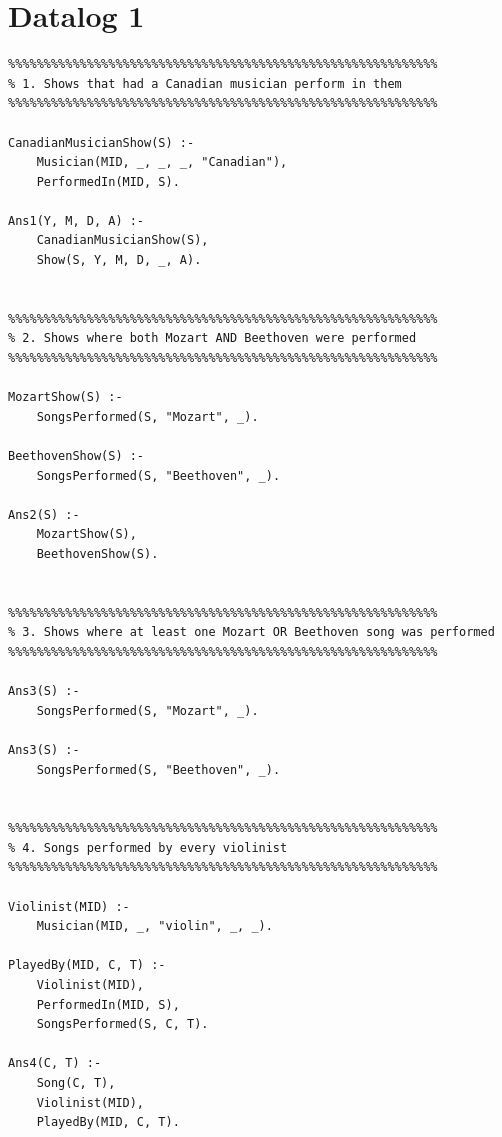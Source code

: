 \documentclass{article}
\begin{document}
\section*{Datalog 1}

\begin{verbatim}
%%%%%%%%%%%%%%%%%%%%%%%%%%%%%%%%%%%%%%%%%%%%%%%%%%%%%%%%%%%%
% 1. Shows that had a Canadian musician perform in them
%%%%%%%%%%%%%%%%%%%%%%%%%%%%%%%%%%%%%%%%%%%%%%%%%%%%%%%%%%%%

CanadianMusicianShow(S) :-
    Musician(MID, _, _, _, "Canadian"),
    PerformedIn(MID, S).

Ans1(Y, M, D, A) :-
    CanadianMusicianShow(S),
    Show(S, Y, M, D, _, A).


%%%%%%%%%%%%%%%%%%%%%%%%%%%%%%%%%%%%%%%%%%%%%%%%%%%%%%%%%%%%
% 2. Shows where both Mozart AND Beethoven were performed
%%%%%%%%%%%%%%%%%%%%%%%%%%%%%%%%%%%%%%%%%%%%%%%%%%%%%%%%%%%%

MozartShow(S) :-
    SongsPerformed(S, "Mozart", _).

BeethovenShow(S) :-
    SongsPerformed(S, "Beethoven", _).

Ans2(S) :-
    MozartShow(S),
    BeethovenShow(S).


%%%%%%%%%%%%%%%%%%%%%%%%%%%%%%%%%%%%%%%%%%%%%%%%%%%%%%%%%%%%
% 3. Shows where at least one Mozart OR Beethoven song was performed
%%%%%%%%%%%%%%%%%%%%%%%%%%%%%%%%%%%%%%%%%%%%%%%%%%%%%%%%%%%%

Ans3(S) :-
    SongsPerformed(S, "Mozart", _).

Ans3(S) :-
    SongsPerformed(S, "Beethoven", _).


%%%%%%%%%%%%%%%%%%%%%%%%%%%%%%%%%%%%%%%%%%%%%%%%%%%%%%%%%%%%
% 4. Songs performed by every violinist
%%%%%%%%%%%%%%%%%%%%%%%%%%%%%%%%%%%%%%%%%%%%%%%%%%%%%%%%%%%%

Violinist(MID) :-
    Musician(MID, _, "violin", _, _).

PlayedBy(MID, C, T) :-
    Violinist(MID),
    PerformedIn(MID, S),
    SongsPerformed(S, C, T).

Ans4(C, T) :-
    Song(C, T),
    Violinist(MID),
    PlayedBy(MID, C, T).
\end{verbatim}
\end{document}
